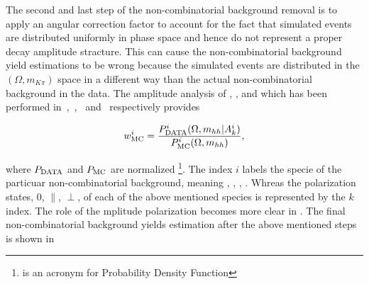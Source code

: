 The second and last step of the non-combinatorial background removal is to apply an angular correction factor to account for the fact that
simulated events are distributed uniformly in phase space and hence do not represent a proper decay amplitude stracture.
This can cause the non-combinatorial background yield estimations to be wrong because the simulated events are distributed in the $(\Omega, m_{K\pi})$ space
in a different way than the actual non-combinatorial background in the data. The amplitude analysis of \BdJpsipipi, \BsJpsipipi, \BsJpsiKK and \LbJpsipK
which has been performed in~\cite{SheldonBdpipi},~\cite{SheldonBspipi},~\cite{SheldonKK} and~\cite{Gao:1701984} respectively provides

\begin{equation}
w_{\rm MC}^i = \frac{P_{\rm DATA}^i (\Omega, m_{hh}  | A_k^i)} {P_{\rm MC}^i(\Omega, m_{hh})},
\end{equation}

\noindent where $P_{\rm DATA}$ and $P_{\rm MC}$ are normalized \pdfs\footnote{\pdf is an acronym for Probability Density Function}.
The index $i$ labels the specie of the particuar non-combinatorial background, meaning \BdJpsipipi, \BsJpsipipi, \BsJpsiKK, \LbJpsipK.
Whreas the polarization states, $0$, $\parallel$, $\perp$, of each of the above mentioned species is represented by the $k$ index.
The role of the mplitude polarization becomes more clear in .
The final non-combinatorial background yields estimation after the above mentioned steps is shown in 

